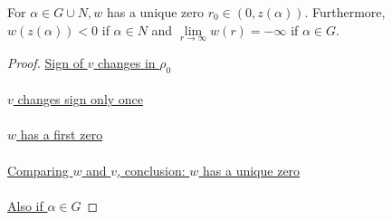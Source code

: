 \begin{lemma}\label{wq}For $\alpha\in G\cup N,w$ has a unique zero $r_0\in(0,z(\alpha)).$ Furthermore, $w(z(\alpha))<0$ if $\alpha\in N$ and $\underset{r\to\infty}{\lim}w(r)=-\infty$ if $\alpha\in G$.
\begin{proof} 


\underline{Sign of $v$ changes in $\rho_0$} \\ \\ 

\underline{$v$ changes sign only once} \\ \\  

\underline{$w$ has a first zero} \\ \\ 

\underline{Comparing $w$ and $v$, conclusion: $w$ has a unique zero} \\ \\ 

\underline{Also if $\alpha\in G$}


\end{proof} 
\end{lemma}